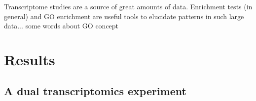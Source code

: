 \documentclass{bmcart}
\begin{document}
\item{Transcriptome studies are a source of great amounts of data. Enrichment tests (in general) and GO enrichment are
useful tools to elucidate patterns in such large data... some words about GO concept}


\section*{Results}


\subsection*{A dual transcriptomics experiment}
\end{document}
